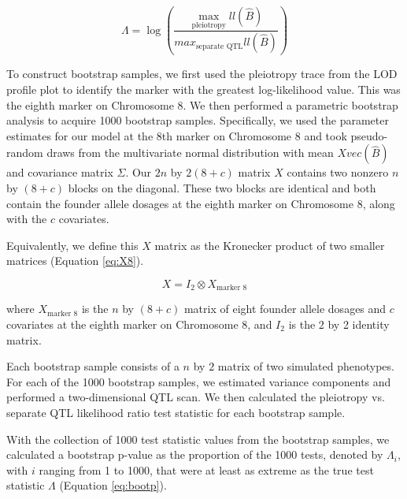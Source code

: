 \documentclass{book}
\begin{document}
\begin{equation}
\Lambda = \log\left(\frac{\max_{\text{pleiotropy}}ll(\hat B)}{max_{\text{separate QTL}}ll(\hat B)}\right)
\end{equation}



To construct bootstrap samples, we first used the pleiotropy trace from the LOD profile plot to identify the marker with the greatest log-likelihood value. This was the eighth marker on Chromosome 8. We then performed a parametric bootstrap analysis to acquire 1000 bootstrap samples. Specifically, we used the parameter estimates for our model at the 8th marker on Chromosome 8 and took pseudo-random draws from the multivariate normal distribution with mean $Xvec(\hat B)$ and covariance matrix $\Sigma$. Our $2n$ by $2(8 + c)$ matrix $X$ contains two nonzero $n$ by $(8 + c)$ blocks on the diagonal. These two blocks are identical and both contain the founder allele dosages at the eighth marker on Chromosome 8, along with the $c$ covariates. 

Equivalently, we define this $X$ matrix as the Kronecker product of two smaller matrices (Equation \ref{eq:X8}). 

\begin{equation}
X = I_2 \otimes X_{\text{marker 8}}
\label{eq:X8}
\end{equation}

where $X_{\text{marker 8}}$ is the $n$ by $(8 + c)$ matrix of eight founder allele dosages and $c$ covariates at the eighth marker on Chromosome 8, and $I_2$ is the 2 by 2 identity matrix.

Each bootstrap sample consists of a $n$ by $2$ matrix of two simulated phenotypes. For each of the 1000 bootstrap samples, we estimated variance components and performed a two-dimensional QTL scan. We then calculated the pleiotropy vs. separate QTL likelihood ratio test statistic for each bootstrap sample.



With the collection of 1000 test statistic values from the bootstrap samples, we calculated a bootstrap p-value as the proportion of the 1000 tests, denoted by $\Lambda_i$, with $i$ ranging from 1 to 1000, that were at least as extreme as the true test statistic $\Lambda$ (Equation \ref{eq:bootp}).
\end{document}
